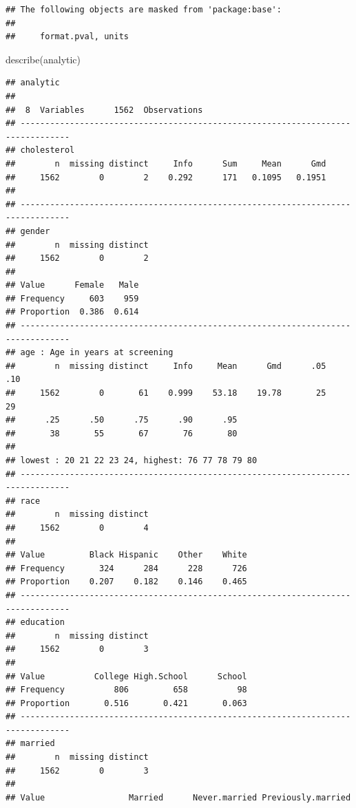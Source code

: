 \documentclass[
]{book}
\newenvironment{Shaded}{\begin{snugshade}}{\end{snugshade}}
\newcommand{\FunctionTok}[1]{\textcolor[rgb]{0.00,0.00,0.00}{#1}}
\newcommand{\NormalTok}[1]{#1}
\begin{document}
\begin{verbatim}
## The following objects are masked from 'package:base':
## 
##     format.pval, units
\end{verbatim}

\begin{Shaded}
\begin{Highlighting}[]
\FunctionTok{describe}\NormalTok{(analytic)}
\end{Highlighting}
\end{Shaded}

\begin{verbatim}
## analytic 
## 
##  8  Variables      1562  Observations
## --------------------------------------------------------------------------------
## cholesterol 
##        n  missing distinct     Info      Sum     Mean      Gmd 
##     1562        0        2    0.292      171   0.1095   0.1951 
## 
## --------------------------------------------------------------------------------
## gender 
##        n  missing distinct 
##     1562        0        2 
##                         
## Value      Female   Male
## Frequency     603    959
## Proportion  0.386  0.614
## --------------------------------------------------------------------------------
## age : Age in years at screening 
##        n  missing distinct     Info     Mean      Gmd      .05      .10 
##     1562        0       61    0.999    53.18    19.78       25       29 
##      .25      .50      .75      .90      .95 
##       38       55       67       76       80 
## 
## lowest : 20 21 22 23 24, highest: 76 77 78 79 80
## --------------------------------------------------------------------------------
## race 
##        n  missing distinct 
##     1562        0        4 
##                                               
## Value         Black Hispanic    Other    White
## Frequency       324      284      228      726
## Proportion    0.207    0.182    0.146    0.465
## --------------------------------------------------------------------------------
## education 
##        n  missing distinct 
##     1562        0        3 
##                                               
## Value          College High.School      School
## Frequency          806         658          98
## Proportion       0.516       0.421       0.063
## --------------------------------------------------------------------------------
## married 
##        n  missing distinct 
##     1562        0        3 
##                                                                    
## Value                 Married      Never.married Previously.married

\end{verbatim}
\end{document}

